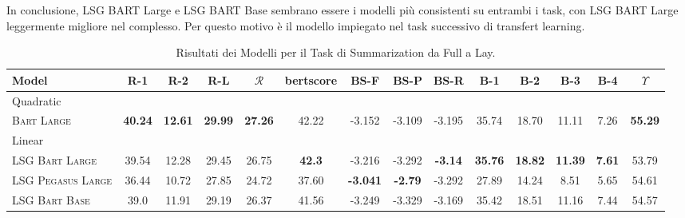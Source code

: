 \documentclass[12pt,a4paper,twoside,openright]{book}
\begin{document}
In conclusione, LSG BART Large e LSG BART Base sembrano essere i modelli più consistenti su entrambi i task, con LSG BART Large leggermente migliore nel complesso. Per questo motivo è il modello impiegato nel task successivo di transfert learning. 
\begin{table}
\centering
\begin{adjustbox}{width=\textwidth,center}
\begin{tabular}{@{}lccccccccccccc@{}}
\toprule
\textbf{Model} & \textbf{R-1} & \textbf{R-2} & \textbf{R-L} & \textbf{\(\mathcal{R}\)} & \textbf{bertscore} & \textbf{BS-F} & \textbf{BS-P} & \textbf{BS-R} & \textbf{B-1} & \textbf{B-2} & \textbf{B-3} & \textbf{B-4} & \textbf{\(\Upsilon\)} \\
\midrule
\multicolumn{14}{l}{Quadratic} \\
\rowcolor[rgb]{0.965,0.965,0.965} \textsc{Bart Large} & \textbf{40.24} & \textbf{12.61} & \textbf{29.99} & \textbf{27.26} & 42.22 & -3.152 & -3.109 & -3.195 & 35.74 & 18.70 & 11.11 & 7.26 & \textbf{55.29} \\
\midrule
\multicolumn{14}{l}{Linear} \\
\textsc{LSG Bart Large} & 39.54 & 12.28 & 29.45 & 26.75 & \textbf{42.3} & -3.216 & -3.292 & \textbf{-3.14} & \textbf{35.76} & \textbf{18.82} & \textbf{11.39} & \textbf{7.61} & 53.79 \\
\rowcolor[rgb]{0.965,0.965,0.965} \textsc{LSG Pegasus Large} & 36.44 & 10.72 & 27.85 & 24.72 & 37.60 & \textbf{-3.041} & \textbf{-2.79} & -3.292 & 27.89 & 14.24 & 8.51 & 5.65 & 54.61 \\
\textsc{LSG Bart Base} & 39.0 & 11.91 & 29.19 & 26.37 & 41.56 & -3.249 & -3.329 & -3.169 & 35.42 & 18.51 & 11.16 & 7.44 & 54.57 \\
\bottomrule
\end{tabular}
\end{adjustbox}
\caption{Risultati dei Modelli per il Task di Summarization da Full a Lay.}
\label{tab:res-seq2seq-lay}
\end{table}
\end{document}
